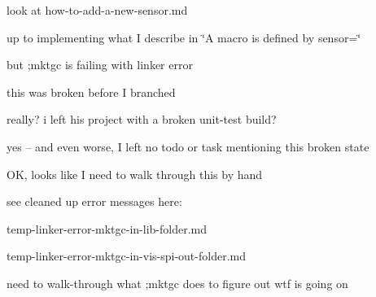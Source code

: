 
\begin{DoxyItemize}
\item look at {\ttfamily how-\/to-\/add-\/a-\/new-\/sensor.\+md}
\begin{DoxyItemize}
\item up to implementing what I describe in \char`\"{}\+A macro is defined by sensor=\char`\"{}
\item but ;mktgc is failing with linker error
\begin{DoxyItemize}
\item this was broken before I branched
\item really? i left his project with a broken unit-\/test build?
\item yes -- and even worse, I left no todo or task mentioning this broken state
\end{DoxyItemize}
\item OK, looks like I need to walk through this by hand
\item see cleaned up error messages here\+:
\begin{DoxyItemize}
\item temp-\/linker-\/error-\/mktgc-\/in-\/lib-\/folder.\+md
\item temp-\/linker-\/error-\/mktgc-\/in-\/vis-\/spi-\/out-\/folder.\+md
\end{DoxyItemize}
\item need to walk-\/through what ;mktgc does to figure out wtf is going on
\end{DoxyItemize}
\end{DoxyItemize}


\begin{DoxyCode}{0}

\end{DoxyCode}



\begin{DoxyCode}{0}

\end{DoxyCode}



\begin{DoxyCode}{0}

\end{DoxyCode}



\begin{DoxyCode}{0}

\end{DoxyCode}
 